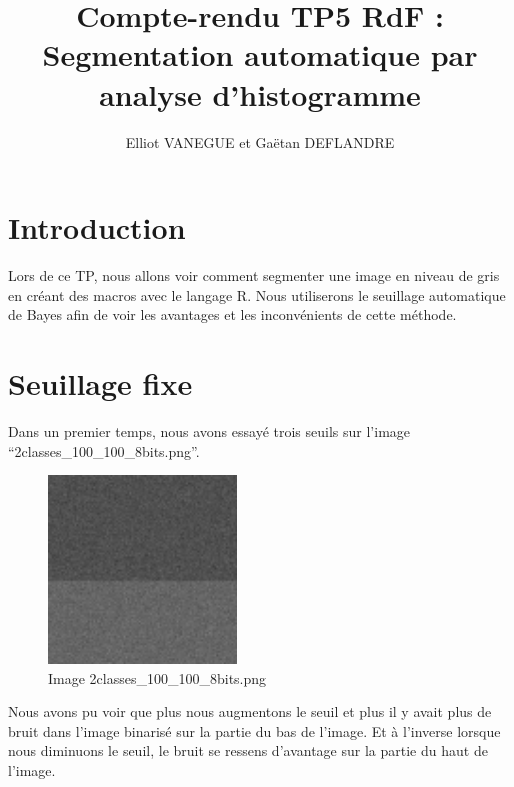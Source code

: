 \documentclass[a4paper,11pt]{article}
\title{Compte-rendu TP5 RdF : Segmentation automatique par analyse d’histogramme}
\author{Elliot VANEGUE et Gaëtan DEFLANDRE}
\begin{document}


  \maketitle
  
  \mbox{}
  \newpage
  \clearpage
  
  \section*{Introduction}
  Lors de ce TP, nous allons voir comment segmenter une image en niveau de gris en
  créant des macros avec le langage R. Nous utiliserons le seuillage automatique 
  de Bayes afin de voir les avantages et les inconvénients de cette méthode.
  

  \section{Seuillage fixe}
  Dans un premier temps, nous avons essayé trois seuils sur l'image \enquote{2classes\_100\_100\_8bits.png}.\\
  
  \begin{figure}[H]
    \center
    \includegraphics[width=5cm]{2classes_100_100_8bits.png}
    \caption{Image 2classes\_100\_100\_8bits.png}
  \end{figure}
  Nous avons pu voir que plus nous augmentons le seuil et plus il y avait plus de bruit dans l'image
  binarisé sur la partie du bas de l'image. Et à l'inverse lorsque nous diminuons le seuil, le bruit 
  se ressens d'avantage sur la partie du haut de l'image.\\
  
\end{document}
